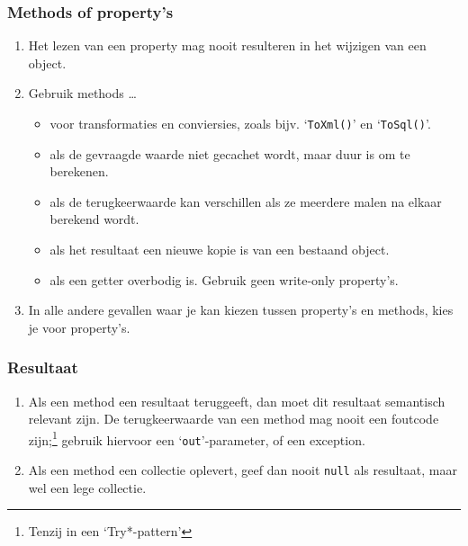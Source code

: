 \documentclass[a4paper,11pt]{article}
\begin{document}
\subsubsection{Methods of property's}
\begin{enumerate}[resume]
\item Het lezen van een property mag nooit resulteren in het wijzigen van
een object.
\item Gebruik methods \ldots
\begin{itemize}
\item voor transformaties en conviersies, zoals bijv. `\lstinline !ToXml()!' en `\lstinline !ToSql()!'.
\item als de gevraagde waarde niet gecachet wordt, maar duur is om te berekenen.
\item als de terugkeerwaarde kan verschillen als ze meerdere malen na
elkaar berekend wordt.
\item als het resultaat een nieuwe kopie is van een bestaand object.
\item als een getter overbodig is.  Gebruik geen write-only property's.
\end{itemize}
\item In alle andere gevallen waar je kan kiezen tussen property's en methods, kies je voor property's.
\end{enumerate}

\subsubsection{Resultaat}
\begin{enumerate}[resume]
\item Als een method een resultaat teruggeeft, dan moet dit resultaat
semantisch relevant zijn.  De terugkeerwaarde van een method mag nooit een
foutcode zijn;\footnote{Tenzij in een `Try*-pattern'} gebruik hiervoor een `\lstinline !out!'-parameter, of een
exception.
\item Als een method een collectie oplevert, geef dan nooit 
\lstinline !null! als resultaat, maar wel een lege
collectie.
\end{enumerate}
\end{document}
